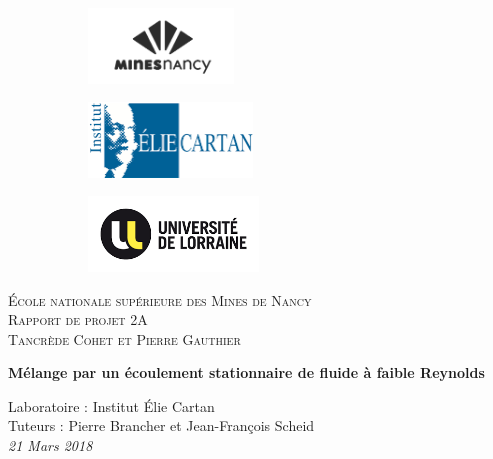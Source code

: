 \documentclass[a4paper,12pt,titlepage]{report}
\begin{document}
\begin{titlepage}
 
	\begin{center}
	\begin{figure}[!h]
	\centering	
		\begin{subfigure}[b]{0.3\textwidth}
		\includegraphics[height = 2cm, keepaspectratio]{graphes/mines_nancy.png}
		\end{subfigure}
		\begin{subfigure}[b]{0.3\textwidth}
		\includegraphics[height = 2cm, keepaspectratio]{graphes/elie_cartan.png}
		\end{subfigure}
		\begin{subfigure}[b]{0.3\textwidth}
		\includegraphics[height = 2cm, keepaspectratio]{graphes/univ_lorraine.png}
	\end{subfigure}
	\end{figure}
 
	\textsc{École nationale supérieure des Mines de Nancy}\\[2cm]
	\textsc{Rapport de projet 2A}\\[1cm]
	\textsc{Tancrède Cohet et Pierre Gauthier}\\[1cm]
 
	\begin{doublespace}
		{ \huge \bfseries{Mélange par un écoulement stationnaire de fluide à faible 				Reynolds}}\\[2cm]
	\end{doublespace}
	\textmd{Laboratoire : Institut Élie Cartan}\\[1cm]
	\textmd{Tuteurs : Pierre Brancher et Jean-François Scheid }\\[1cm]
 
	\vfill
	{\textit{{\large 21 Mars 2018}}}
 
	\end{center}
\end{titlepage}
\end{document}
